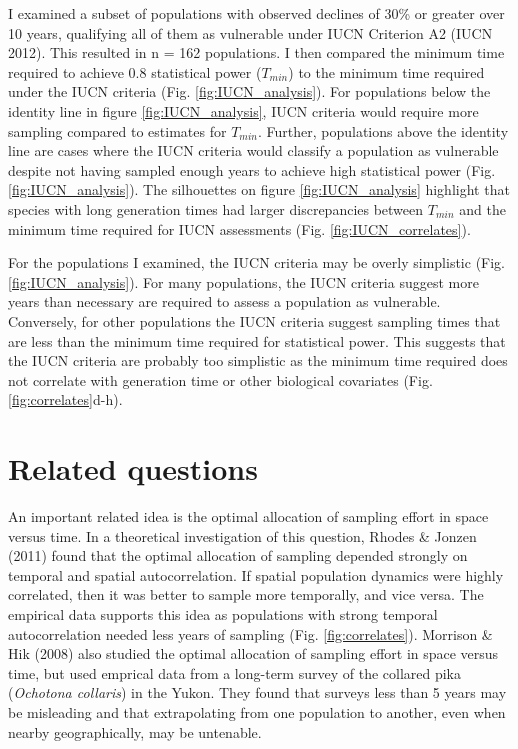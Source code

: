 \documentclass[12pt,]{article}
\begin{document}
I examined a subset of populations with observed declines of 30\% or
greater over 10 years, qualifying all of them as vulnerable under IUCN
Criterion A2 (IUCN 2012). This resulted in n = 162 populations. I then
compared the minimum time required to achieve 0.8 statistical power
(\(T_{min}\)) to the minimum time required under the IUCN criteria (Fig.
\ref{fig:IUCN_analysis}). For populations below the identity line in
figure \ref{fig:IUCN_analysis}, IUCN criteria would require more
sampling compared to estimates for \(T_{min}\). Further, populations
above the identity line are cases where the IUCN criteria would classify
a population as vulnerable despite not having sampled enough years to
achieve high statistical power (Fig. \ref{fig:IUCN_analysis}). The
silhouettes on figure \ref{fig:IUCN_analysis} highlight that species
with long generation times had larger discrepancies between \(T_{min}\)
and the minimum time required for IUCN assessments (Fig.
\ref{fig:IUCN_correlates}).

For the populations I examined, the IUCN criteria may be overly
simplistic (Fig. \ref{fig:IUCN_analysis}). For many populations, the
IUCN criteria suggest more years than necessary are required to assess a
population as vulnerable. Conversely, for other populations the IUCN
criteria suggest sampling times that are less than the minimum time
required for statistical power. This suggests that the IUCN criteria are
probably too simplistic as the minimum time required does not correlate
with generation time or other biological covariates (Fig.
\ref{fig:correlates}d-h).

\section{Related questions}\label{related-questions}

An important related idea is the optimal allocation of sampling effort
in space versus time. In a theoretical investigation of this question,
Rhodes \& Jonzen (2011) found that the optimal allocation of sampling
depended strongly on temporal and spatial autocorrelation. If spatial
population dynamics were highly correlated, then it was better to sample
more temporally, and vice versa. The empirical data supports this idea
as populations with strong temporal autocorrelation needed less years of
sampling (Fig. \ref{fig:correlates}). Morrison \& Hik (2008) also
studied the optimal allocation of sampling effort in space versus time,
but used emprical data from a long-term survey of the collared pika
(\emph{Ochotona collaris}) in the Yukon. They found that surveys less
than 5 years may be misleading and that extrapolating from one
population to another, even when nearby geographically, may be
untenable.
\end{document}
